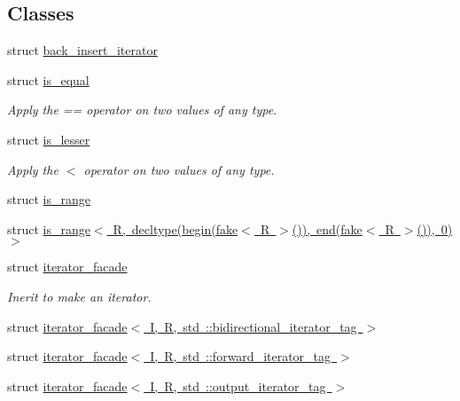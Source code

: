 \subsection*{Classes}
\begin{DoxyCompactItemize}
\item 
struct \mbox{\hyperlink{structrah_1_1back__insert__iterator}{back\+\_\+insert\+\_\+iterator}}
\item 
struct \mbox{\hyperlink{structrah_1_1is__equal}{is\+\_\+equal}}
\begin{DoxyCompactList}\small\item\em Apply the \textquotesingle{}==\textquotesingle{} operator on two values of any type. \end{DoxyCompactList}\item 
struct \mbox{\hyperlink{structrah_1_1is__lesser}{is\+\_\+lesser}}
\begin{DoxyCompactList}\small\item\em Apply the \textquotesingle{}$<$\textquotesingle{} operator on two values of any type. \end{DoxyCompactList}\item 
struct \mbox{\hyperlink{structrah_1_1is__range}{is\+\_\+range}}
\item 
struct \mbox{\hyperlink{structrah_1_1is__range_3_01_r_00_01decltype_07begin_07fake_3_01_r_01_4_07_08_08_00_01end_07fake_cf1a9a1e2579209cb82001bc9eda23c1}{is\+\_\+range$<$ R, decltype(begin(fake$<$ R $>$()), end(fake$<$ R $>$()), 0)$>$}}
\item 
struct \mbox{\hyperlink{structrah_1_1iterator__facade}{iterator\+\_\+facade}}
\begin{DoxyCompactList}\small\item\em Inerit to make an iterator. \end{DoxyCompactList}\item 
struct \mbox{\hyperlink{structrah_1_1iterator__facade_3_01_i_00_01_r_00_01std_01_1_1bidirectional__iterator__tag_01_4}{iterator\+\_\+facade$<$ I, R, std \+::bidirectional\+\_\+iterator\+\_\+tag $>$}}
\item 
struct \mbox{\hyperlink{structrah_1_1iterator__facade_3_01_i_00_01_r_00_01std_01_1_1forward__iterator__tag_01_4}{iterator\+\_\+facade$<$ I, R, std \+::forward\+\_\+iterator\+\_\+tag $>$}}
\item 
struct \mbox{\hyperlink{structrah_1_1iterator__facade_3_01_i_00_01_r_00_01std_01_1_1output__iterator__tag_01_4}{iterator\+\_\+facade$<$ I, R, std \+::output\+\_\+iterator\+\_\+tag $>$}}
\item 

\end{DoxyCompactItemize}
